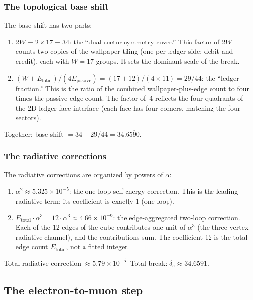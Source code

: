 \documentclass[11pt,a4paper]{article}
\theoremstyle{definition}
\theoremstyle{remark}
\newcommand{\Epass}{E_{\mathrm{passive}}}
\newcommand{\Etot}{E_{\mathrm{total}}}
\begin{document}
\subsubsection{The topological base shift}

The base shift has two parts:

\begin{enumerate}[nosep]
  \item $2W = 2 \times 17 = 34$: the ``dual sector symmetry cover.''
    This factor of $2W$ counts two copies of the wallpaper tiling (one per
    ledger side: debit and credit), each with $W = 17$ groups.  It sets the
    dominant scale of the break.

  \item $(W + \Etot)/(4\Epass) = (17 + 12)/(4 \times 11) = 29/44$: the
    ``ledger fraction.''  This is the ratio of the combined wallpaper-plus-edge
    count to four times the passive edge count.  The factor of~4 reflects the
    four quadrants of the 2D ledger-face interface (each face has four corners,
    matching the four sectors).
\end{enumerate}

\noindent
Together: base shift $= 34 + 29/44 = 34.6\overline{590}$.

\subsubsection{The radiative corrections}

The radiative corrections are organized by powers of $\alpha$:

\begin{enumerate}[nosep]
  \item $\alpha^2 \approx 5.325 \times 10^{-5}$: the one-loop self-energy
    correction.  This is the leading radiative term; its coefficient is exactly
    1 (one loop).

  \item $\Etot \cdot \alpha^3 = 12 \cdot \alpha^3 \approx 4.66 \times
    10^{-6}$: the edge-aggregated two-loop correction.  Each of the 12 edges
    of the cube contributes one unit of $\alpha^3$ (the three-vertex radiative
    channel), and the contributions sum.  The coefficient 12 is the total edge
    count $\Etot$, not a fitted integer.
\end{enumerate}

\noindent
Total radiative correction $\approx 5.79 \times 10^{-5}$.
Total break: $\delta_e \approx 34.6591$.

\subsection{The electron-to-muon step}
\end{document}
